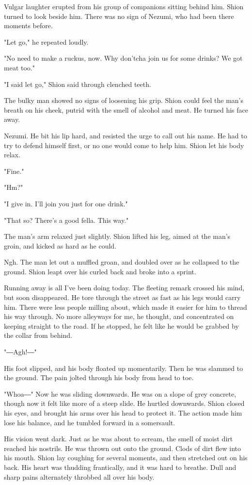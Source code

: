 Vulgar laughter erupted from his group of companions sitting behind him.
Shion turned to look beside him. There was no sign of Nezumi, who had
been there moments before.

"Let go," he repeated loudly.

"No need to make a ruckus, now. Why don'tcha join us for some drinks? We
got meat too."

"I said let go," Shion said through clenched teeth.

The bulky man showed no signs of loosening his grip. Shion could feel
the man's breath on his cheek, putrid with the smell of alcohol and
meat. He turned his face away.

Nezumi. He bit his lip hard, and resisted the urge to call out his name.
He had to try to defend himself first, or no one would come to help him.
Shion let his body relax.

"Fine."

"Hm?"

"I give in. I'll join you just for one drink."

"That so? There's a good fella. This way."

The man's arm relaxed just slightly. Shion lifted his leg, aimed at the
man's groin, and kicked as hard as he could.

Ngh. The man let out a muffled groan, and doubled over as he collapsed
to the ground. Shion leapt over his curled back and broke into a sprint.

Running away is all I've been doing today. The fleeting remark crossed
his mind, but soon disappeared. He tore through the street as fast as
his legs would carry him. There were less people milling about, which
made it easier for him to thread his way through. No more alleyways for
me, he thought, and concentrated on keeping straight to the road. If he
stopped, he felt like he would be grabbed by the collar from behind.

"―Agh!―"

His foot slipped, and his body floated up momentarily. Then he was
slammed to the ground. The pain jolted through his body from head to
toe.

"Whoa―" Now he was sliding downwards. He was on a slope of grey
concrete, though now it felt like more of a steep slide. He hurtled
downwards. Shion closed his eyes, and brought his arms over his head to
protect it. The action made him lose his balance, and he tumbled forward
in a somersault.

His vision went dark. Just as he was about to scream, the smell of moist
dirt reached his nostrils. He was thrown out onto the ground. Clods of
dirt flew into his mouth. Shion lay coughing for several moments, and
then stretched out on his back. His heart was thudding frantically, and
it was hard to breathe. Dull and sharp pains alternately throbbed all
over his body.

